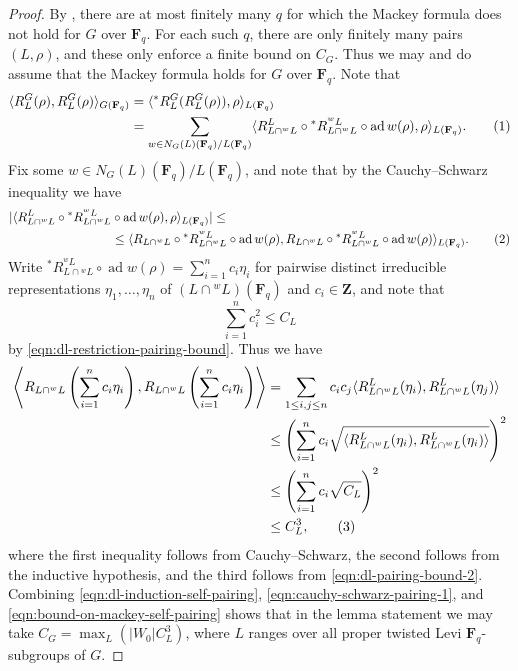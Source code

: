 \documentclass[11pt,reqno]{amsart}
\theoremstyle{definition}
\newcommand{\F}{{\mathbf F}}
\newcommand{\Z}{{\mathbf Z}}
\DeclareMathOperator{\ad}{ad}
\begin{document}
\begin{proof}
    By \cite[Th\'eor\`eme 5.1.1]{Bon98}, there are at most finitely many $q$ for which the Mackey formula does not hold for $G$ over $\F_q$. For each such $q$, there are only finitely many pairs $(L, \rho)$, and these only enforce a finite bound on $C_G$. Thus we may and do assume that the Mackey formula holds for $G$ over $\F_q$. Note that
    \begin{align*}
    \langle R_L^G(\rho), R_L^G(\rho)\rangle_{G(\F_q)} &= \langle {}^*R^G_L(R_L^G(\rho)), \rho\rangle_{L(\F_q)} \\
        &= \sum_{w \in N_G(L)(\F_q)/L(\F_q)} \langle R_{L \cap {}^wL}^L \circ {}^*R^{^wL}_{L\cap{}^wL} \circ \ad w(\rho), \rho\rangle_{L(\F_q)}. \addtocounter{equation}{1}\tag{\theequation} \label{eqn:dl-induction-self-pairing}
    \end{align*}
    Fix some $w \in N_G(L)(\F_q)/L(\F_q)$, and note that by the Cauchy--Schwarz inequality we have
    \begin{align*}
    |\langle R_{L \cap {}^wL}^L \circ {}^*R^{^wL}_{L\cap{}^wL} &\circ \ad w(\rho), \rho\rangle_{L(\F_q)}| \leq \\
    &\leq \langle R_{L \cap {}^w L} \circ {}^*R^{^wL}_{L\cap {}^wL} \circ \ad w(\rho), R_{L \cap {}^w L} \circ {}^*R^{^wL}_{L\cap {}^wL} \circ \ad w(\rho)\rangle_{L(\F_q)}. \addtocounter{equation}{1}\tag{\theequation} \label{eqn:cauchy-schwarz-pairing-1}
    \end{align*}
    Write ${}^*R^{^wL}_{L\cap {}^wL} \circ \ad w(\rho) = \sum_{i=1}^n c_i\eta_i$ for pairwise distinct irreducible representations $\eta_1, \dots, \eta_n$ of $(L \cap {}^wL)(\F_q)$ and $c_i \in \Z$, and note that
    \begin{equation}\label{eqn:dl-pairing-bound-2}
        \sum_{i=1}^n c_i^2 \leq C_L
    \end{equation}
    by \eqref{eqn:dl-restriction-pairing-bound}. Thus we have
    \begin{align*}
    \left\langle R_{L \cap {}^w L}\left(\sum_{i=1}^n c_i\eta_i\right), R_{L \cap {}^w L}\left(\sum_{i=1}^n c_i\eta_i\right)\right\rangle &= \sum_{1 \leq i, j \leq n} c_ic_j \langle R_{L \cap {}^wL}^L(\eta_i), R_{L\cap {}^wL}^L(\eta_j)\rangle \\
        &\leq \left(\sum_{i=1}^n c_i\sqrt{\langle R_{L\cap {}^wL}^L(\eta_i), R_{L\cap{}^wL}^L(\eta_i)\rangle} \right)^2 \\
        &\leq \left(\sum_{i=1}^n c_i\sqrt{C_L}\right)^2 \\
        &\leq C_L^3, \addtocounter{equation}{1}\tag{\theequation} \label{eqn:bound-on-mackey-self-pairing}
    \end{align*}
    where the first inequality follows from Cauchy--Schwarz, the second follows from the inductive hypothesis, and the third follows from \eqref{eqn:dl-pairing-bound-2}. Combining \eqref{eqn:dl-induction-self-pairing}, \eqref{eqn:cauchy-schwarz-pairing-1}, and \eqref{eqn:bound-on-mackey-self-pairing} shows that in the lemma statement we may take $C_G = \max_L(|W_0|C_L^3)$, where $L$ ranges over all proper twisted Levi $\F_q$-subgroups of $G$.
\end{proof}
\end{document}
